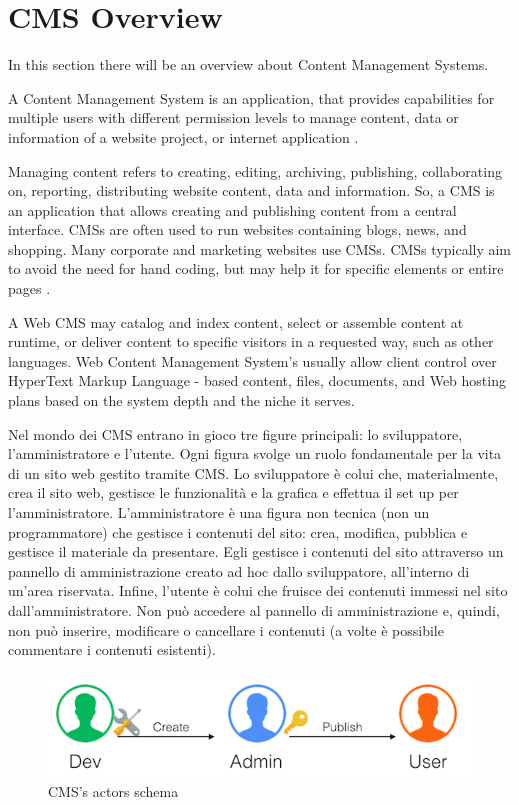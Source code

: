 \section{CMS Overview}
\label{sec:CMS_overview}

In this section there will be an overview about Content Management Systems.

A Content Management System is an application, that provides capabilities for multiple users with different permission levels to manage content, data or information of a website project, or internet application \cite{cms_def}.

Managing content refers to creating, editing, archiving, publishing, collaborating on, reporting, distributing website content, data and information.
So, a CMS is an application that allows creating and publishing content from a central interface. CMSs are often used to run websites containing blogs, news, and shopping. Many corporate and marketing websites use CMSs. CMSs typically aim to avoid the need for hand coding, but may help it for specific elements or entire pages \cite{cms_wiki}. 

A Web CMS may catalog and index content, select or assemble content at runtime, or deliver content to specific visitors in a requested way, such as other languages. Web Content Management System's usually allow client control over HyperText Markup Language - based content, files, documents, and Web hosting plans based on the system depth and the niche it serves.



Nel mondo dei CMS entrano in gioco tre figure principali: lo sviluppatore, l’amministratore e l’utente. Ogni figura svolge un ruolo fondamentale per la vita di un sito web gestito tramite CMS.
Lo sviluppatore è colui che, materialmente, crea il sito web, gestisce le funzionalità e la grafica e effettua il set up per l’amministratore.
L’amministratore è una figura non tecnica (non un programmatore) che gestisce i contenuti del sito: crea, modifica, pubblica e gestisce il materiale da presentare. Egli gestisce i contenuti del sito attraverso un pannello di amministrazione creato ad hoc dallo sviluppatore, all’interno di un’area riservata.
Infine, l’utente è colui che fruisce dei contenuti immessi nel sito dall’amministratore. Non può accedere al pannello di amministrazione e, quindi, non può inserire, modificare o cancellare i contenuti (a volte è possibile commentare i contenuti esistenti).



\begin {figure}[h]
\graphicspath{{images/chapter_cms/}}
\includegraphics[width=\textwidth]{cms_schema}
\caption{CMS's actors schema}
\end {figure}


